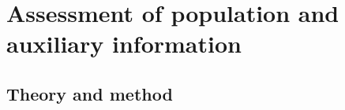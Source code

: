 \documentclass[utf8]{FrontiersinHarvard} %
\renewcommand*{\|}[1][]{\nonscript\:#1\vert\nonscript\:\mathopen{}}
\begin{document}
\medskip







\clearpage
\section{Assessment of population and auxiliary information}
\label{sec:population_step}

\subsection{Theory and method}
\label{sec:populationprior_theory}
\end{document}
